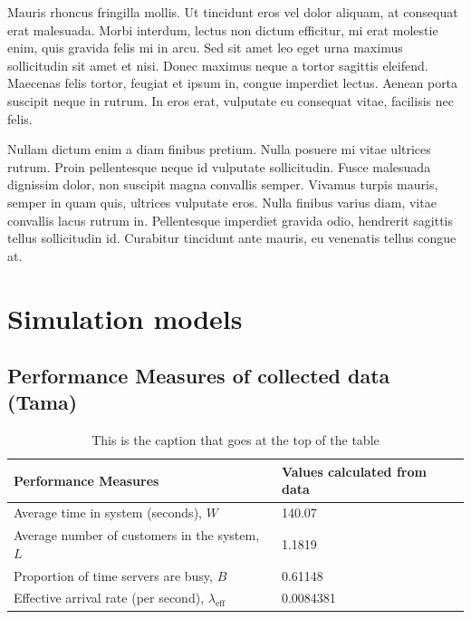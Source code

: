 \documentclass{article}
\begin{document}
Mauris rhoncus fringilla mollis. Ut tincidunt eros vel dolor aliquam, at consequat erat malesuada. Morbi interdum, lectus non dictum efficitur, mi erat molestie enim, quis gravida felis mi in arcu. Sed sit amet leo eget urna maximus sollicitudin sit amet et nisi. Donec maximus neque a tortor sagittis eleifend. Maecenas felis tortor, feugiat et ipsum in, congue imperdiet lectus. Aenean porta suscipit neque in rutrum. In eros erat, vulputate eu consequat vitae, facilisis nec felis.

Nullam dictum enim a diam finibus pretium. Nulla posuere mi vitae ultrices rutrum. Proin pellentesque neque id vulputate sollicitudin. Fusce malesuada dignissim dolor, non suscipit magna convallis semper. Vivamus turpis mauris, semper in quam quis, ultrices vulputate eros. Nulla finibus varius diam, vitae convallis lacus rutrum in. Pellentesque imperdiet gravida odio, hendrerit sagittis tellus sollicitudin id. Curabitur tincidunt ante mauris, eu venenatis tellus congue at.

\section{Simulation models}

\subsection{Performance Measures of collected data (Tama)}

\begin{table}[h!]
    \centering
    \caption{This is the caption that goes at the top of the table}
    \begin{tabu}{*{2}{X[c]}}
        \toprule
        \textbf{Performance Measures} & \textbf{Values calculated from data}\\
        \midrule
        Average time in system (seconds), $W$   & 140.07 \\
        Average number of customers in the system, $L$ & 1.1819\\
        Proportion of time servers are busy, $B$ & 0.61148  \\
        Effective arrival rate (per second), $\lambda_{\text{eff}}$ & 0.0084381\\
        \bottomrule
    \end{tabu}
    \label{tab:Original Data PF}
\end{table}
\end{document}
